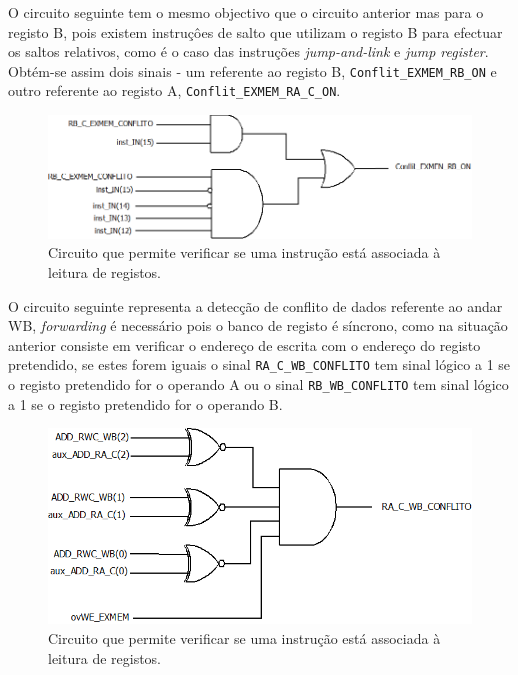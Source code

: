 \documentclass[11pt]{article}
\numberwithin{equation}{section}
\begin{document}
O circuito seguinte tem o mesmo objectivo que o circuito anterior mas para o registo B, pois existem instruçôes de salto que utilizam o registo B para efectuar os saltos relativos, como é o caso das instruções \textit{jump-and-link} e \textit{jump register}. Obtém-se assim dois sinais - um referente ao registo B, \texttt{Conflit\_EXMEM\_RB\_ON} e outro referente ao registo A, \texttt{Conflit\_EXMEM\_RA\_C\_ON}.
\begin{figure}[H]
	\centering
	\includegraphics[keepaspectratio=true, scale=0.27]{imagens/DetecaodeconflitoEXMEMRB}
	\vspace{-0.5em}
	\caption{Circuito que permite verificar se uma instrução está associada à leitura de registos.}
	\vspace{-0.8em}
\end{figure} 

O circuito seguinte representa a detecção de conflito de dados referente ao andar WB, \textit{forwarding} é necessário pois o banco de registo é síncrono, como na situação anterior consiste em verificar o endereço de escrita  com o endereço do registo pretendido, se estes forem iguais o sinal \texttt{RA\_C\_WB\_CONFLITO} tem sinal lógico a 1 se o registo pretendido for o operando A ou o sinal \texttt{RB\_WB\_CONFLITO} tem sinal lógico a 1 se o registo pretendido for o operando B.

\begin{figure}[H]
	\centering
	\includegraphics[keepaspectratio=true, scale=0.27]{imagens/DetecaodeconflitoWB}
	\vspace{-0.5em}
	\caption{Circuito que permite verificar se uma instrução está associada à leitura de registos.}
	\vspace{-0.8em}
\end{figure} 
\end{document}

